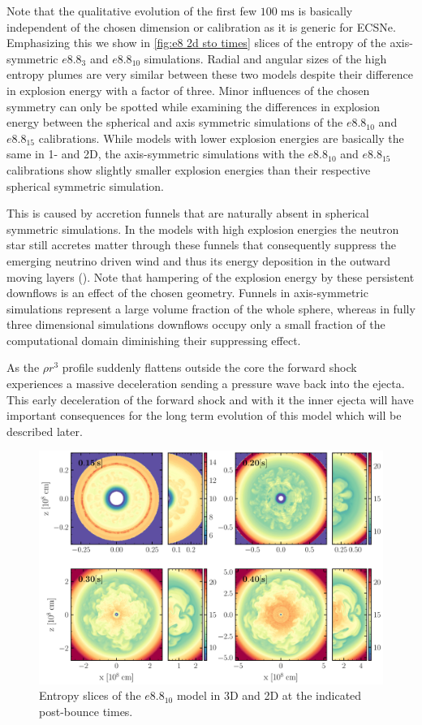 \documentclass[fleqn,usenatbib]{mnras}
\begin{document}
Note that the qualitative evolution of the first few $100\;\mathrm{ms}$ is basically independent of the chosen dimension or calibration as it is generic for ECSNe. Emphasizing this we show in \autoref{fig:e8 2d sto times} slices of the entropy of the axis-symmetric $e8.8_{3}$ and $e8.8_{10}$ simulations. Radial and angular sizes of the high entropy plumes are very similar between these two models despite their difference in explosion energy with a factor of three. 
Minor influences of the chosen symmetry can only be spotted while examining the differences in explosion energy between the spherical and axis symmetric simulations of the $e8.8_{10}$ and $e8.8_{15}$ calibrations. While models with lower explosion energies are basically the same in 1- and 2D, the axis-symmetric simulations with the $e8.8_{10}$ and $e8.8_{15}$ calibrations show slightly smaller explosion energies than their respective spherical symmetric simulation.

This is caused by accretion funnels that are naturally absent in spherical symmetric simulations. 
In the models with high explosion energies the neutron star still accretes matter through these funnels that consequently suppress the emerging neutrino driven wind and thus its energy deposition in the outward moving layers (\cite{Muellera}). Note that hampering of the explosion energy by these persistent downflows is an effect of the chosen geometry. Funnels in axis-symmetric simulations represent a large volume fraction of the whole sphere, whereas in fully three dimensional simulations downflows occupy only a small fraction of the computational domain diminishing their suppressing effect.

As the $\rho r^3$ profile suddenly flattens outside the core the forward shock experiences a massive deceleration sending a pressure wave back into the ejecta. This early deceleration of the forward shock and with it the inner ejecta will have important consequences for the long term evolution of this model which will be described later.

\begin{figure}
 \includegraphics[width=\textwidth]{pic/e8_10_2d3d_sto_cuts_4times.pdf}
 \caption{Entropy slices of the $e8.8_{10}$ model in 3D and 2D at the indicated post-bounce times. }
 \label{fig:e8 sto 4 times}
\end{figure}
\end{document}
